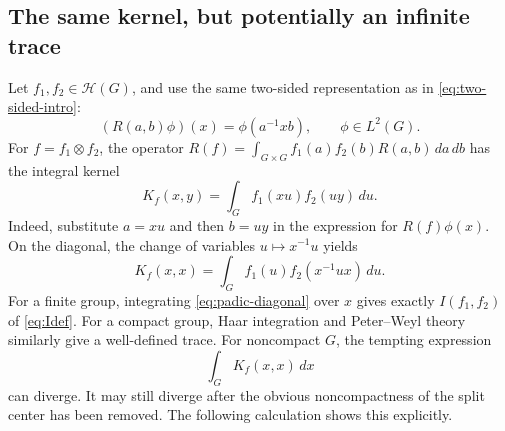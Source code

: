 \documentclass[12pt]{article}
\theoremstyle{remark}
\begin{document}
\subsection{The same kernel, but potentially an infinite trace}
Let $f_1,f_2\in\mathcal H(G)$, and use the same two-sided
representation as in \eqref{eq:two-sided-intro}:
\[
 (R(a,b)\phi)(x)=\phi(a^{-1}xb), \qquad \phi\in L^2(G).
\]
For $f=f_1\otimes f_2$, the operator
$R(f)=\int_{G\times G}f_1(a)f_2(b)R(a,b)\,da\,db$
has the integral kernel
\begin{equation}\label{eq:padic-kernel}
 K_f(x,y)=\int_G f_1(xu)f_2(uy)\,du.
\end{equation}
Indeed, substitute $a=xu$ and then $b=uy$ in the expression for
$R(f)\phi(x)$.  On the diagonal, the change of variables
$u\mapsto x^{-1}u$ yields
\begin{equation}\label{eq:padic-diagonal}
 K_f(x,x)=\int_G f_1(u)f_2(x^{-1}ux)\,du.
\end{equation}
For a finite group, integrating \eqref{eq:padic-diagonal} over $x$
gives exactly $I(f_1,f_2)$ of \eqref{eq:Idef}. For a compact group,
Haar integration and Peter--Weyl theory similarly give a well-defined
trace. For noncompact $G$, the tempting expression
\[
 \int_G K_f(x,x)\,dx
\]
can diverge.  It may still diverge after the obvious noncompactness
of the split center has been removed.  The following calculation
shows this explicitly.
\end{document}
